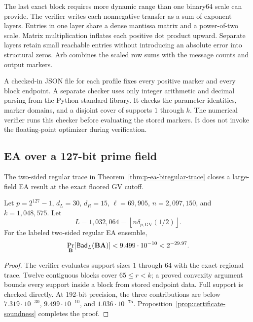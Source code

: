 The last exact block requires more dynamic range than one binary64 scale can
provide.  The verifier writes each nonnegative transfer as a sum of exponent
layers.  Entries in one layer share a dense mantissa matrix and a power-of-two
scale.  Matrix multiplication inflates each positive dot product upward.
Separate layers retain small reachable entries without introducing an
absolute error into structural zeros.  Arb combines the scaled row sums with
the message counts and output markers.

A checked-in JSON file for each profile fixes every positive marker and every
block endpoint.
A separate checker uses only integer arithmetic and decimal parsing from the
Python standard library.  It checks the parameter identities, marker domains,
and a disjoint cover of supports $1$ through $k$.  The numerical verifier runs
this checker before evaluating the stored markers.  It does not invoke the
floating-point optimizer during verification.

\subsection{EA over a 127-bit prime field}

The two-sided regular trace in Theorem~\ref{thm:p-ea-biregular-trace} closes a
large-field EA result at the exact floored GV cutoff.

\begin{theorem}
\label{thm:p-ea-certificate}
Let $p=2^{127}-1$, $d_L=30$, $d_R=15$, $\ell=69{,}905$,
$n=2{,}097{,}150$, and $k=1{,}048{,}575$.  Let
\begin{equation}
 L=1{,}032{,}064
 =\left\lfloor n\delta_{p,\mathrm{GV}}(1/2)\right\rfloor.
\end{equation}
For the labeled two-sided regular EA ensemble,
\begin{equation}
 \Pr_{\mathbf B}[\mathsf{Bad}_L(\mathbf B\mathbf A)]
 <9.499\cdot10^{-10}<2^{-29.97}.
 \label{eq:p-ea-certificate}
\end{equation}
\end{theorem}

\begin{proof}
The verifier evaluates support sizes $1$ through $64$ with the exact regional
trace.  Twelve contiguous blocks cover $65\leq r<k$; a proved convexity
argument bounds every support inside a block from stored endpoint data.  Full
support is checked directly.  At 192-bit precision, the three contributions are below
$7.319\cdot10^{-30}$, $9.499\cdot10^{-10}$, and
$1.036\cdot10^{-75}$.  Proposition~\ref{prop:certificate-soundness} completes
the proof.
\end{proof}


